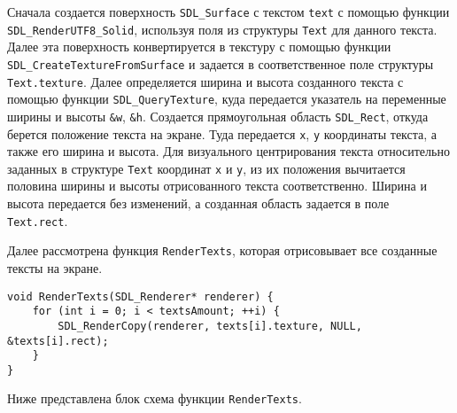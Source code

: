 \documentclass[14pt]{extarticle}
\begin{document}
{    \begin{spacing}{1.5}
        Сначала создается поверхность \verb|SDL_Surface| с текстом \verb|text| с помощью функции \verb|SDL_RenderUTF8_Solid|, используя поля из структуры \verb|Text| для данного текста. Далее эта поверхность конвертируется в текстуру с помощью функции \verb|SDL_CreateTextureFromSurface| и задается в соответственное поле структуры \verb|Text.texture|. Далее определяется ширина и высота созданного текста с помощью функции \verb|SDL_QueryTexture|, куда передается указатель на переменные ширины и высоты \verb|&w|, \verb|&h|. Создается прямоугольная область \verb|SDL_Rect|, откуда берется положение текста на экране. Туда передается \verb|x|, \verb|y| координаты текста, а также его ширина и высота. Для визуального центрирования текста относительно заданных в структуре \verb|Text| координат \verb|x| и \verb|y|, из их положения вычитается половина ширины и высоты отрисованного текста соответственно. Ширина и высота передается без изменений, а созданная область задается в поле \verb|Text.rect|.
        \par
        Далее рассмотрена функция \verb|RenderTexts|, которая отрисовывает все созданные тексты на экране.
    \end{spacing}

    \begin{lstlisting}
void RenderTexts(SDL_Renderer* renderer) {
	for (int i = 0; i < textsAmount; ++i) {
		SDL_RenderCopy(renderer, texts[i].texture, NULL, &texts[i].rect);
	}
}\end{lstlisting}

    \begin{spacing}{1.5}
        \noindent
        Ниже представлена блок схема функции \verb|RenderTexts|.
    \end{spacing}

    \vspace{-0.5em}
    
}
\end{document}
